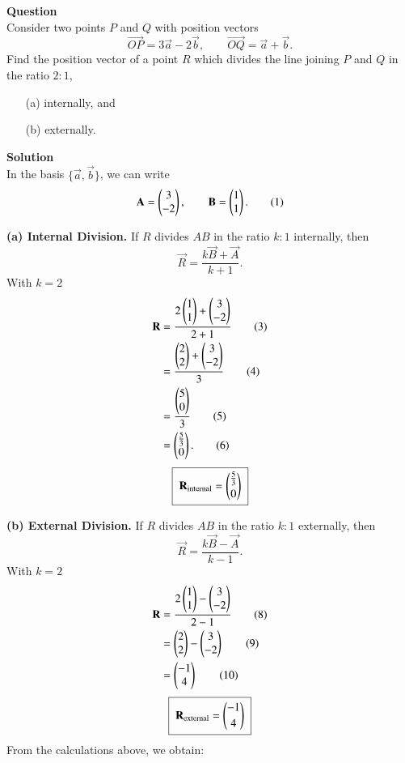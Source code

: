 \documentclass[article,12pt,onecolumn]{IEEEtran}
\theoremstyle{remark}
\begin{document}
\textbf{Question}\\[2pt]
Consider two points $P$ and $Q$ with position vectors
\[
\vec{OP}=3\vec{a}-2\vec{b},
\qquad
\vec{OQ}=\vec{a}+\vec{b}.
\]
Find the position vector of a point $R$ which divides the line joining $P$ and $Q$ in the ratio $2:1$,
\begin{enumerate}
    \item[(a)] internally, and
    \item[(b)] externally.
\end{enumerate}

\vspace{6pt}
\textbf{Solution}\\[2pt]
In the basis $\{\vec a,\vec b\}$, we can write
\[
\mathbf A=\begin{pmatrix}3\\-2\end{pmatrix},
\qquad
\mathbf B=\begin{pmatrix}1\\1\end{pmatrix}. \tag{1}
\]

\textbf{(a) Internal Division.} If $R$ divides $AB$ in the ratio $k:1$ internally, then
\[
\vec R=\frac{k\vec B+\vec A}{k+1}. \tag{2}
\]
With $k=2$ 
\begin{align}
\mathbf R
&=\frac{2\begin{pmatrix}1\\1\end{pmatrix}+\begin{pmatrix}3\\-2\end{pmatrix}}{2+1} \tag{3}\\
&=\frac{\begin{pmatrix}2\\2\end{pmatrix}+\begin{pmatrix}3\\-2\end{pmatrix}}{3} \tag{4}\\
&=\frac{\begin{pmatrix}5\\0\end{pmatrix}}{3} \tag{5}\\
&=\begin{pmatrix}\tfrac{5}{3}\\0\end{pmatrix}. \tag{6}
\end{align}
\[
\boxed{\;\mathbf R_{\text{internal}}=\begin{pmatrix}\tfrac{5}{3}\\[2pt]0\end{pmatrix}\;}
\]

\bigskip
\textbf{(b) External Division.} If $R$ divides $AB$ in the ratio $k:1$ externally, then
\[
\vec R=\frac{k\vec B-\vec A}{k-1}. \tag{7}
\]
With $k=2$ 
\begin{align}
\mathbf R
&=\frac{2\begin{pmatrix}1\\1\end{pmatrix}-\begin{pmatrix}3\\-2\end{pmatrix}}{2-1} \tag{8}\\
&=\begin{pmatrix}2\\2\end{pmatrix}-\begin{pmatrix}3\\-2\end{pmatrix} \tag{9}\\
&=\begin{pmatrix}-1\\4\end{pmatrix} \tag{10}
\end{align}
\[
\boxed{\;\mathbf R_{\text{external}}=\begin{pmatrix}-1\\[2pt]4\end{pmatrix}\;}
\]
From the calculations above, we obtain:
\end{document}
